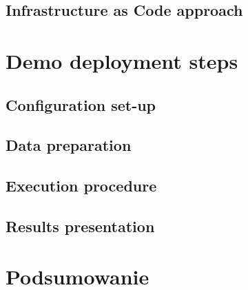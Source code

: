 \documentclass[onecolumn,12pt]{article}
\begin{document}
\subsection{Infrastructure as Code approach}

\section{Demo deployment steps}

\subsection{Configuration set-up}
\subsection{Data preparation}
\subsection{Execution procedure}
\subsection{Results presentation}

\section{Podsumowanie}

%
\end{document}
